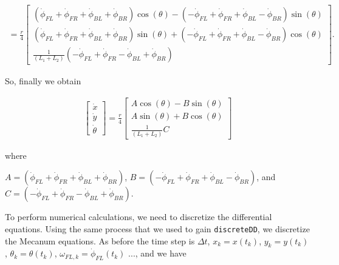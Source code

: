 \[\begin{aligned}
=
\frac{ r}{4}
\begin{bmatrix} \left(\dot{\phi}_{FL} + \dot{\phi}_{FR} + \dot{\phi}_{BL} + \dot{\phi}_{BR}\right) \cos(\theta)
                          -\left( -\dot{\phi}_{FL} + \dot{\phi}_{FR} + \dot{\phi}_{BL} - \dot{\phi}_{BR}\right)\sin(\theta) \\[3mm]
                        \left(\dot{\phi}_{FL} + \dot{\phi}_{FR} + \dot{\phi}_{BL} + \dot{\phi}_{BR}\right) \sin(\theta)
                          +\left( -\dot{\phi}_{FL} + \dot{\phi}_{FR} + \dot{\phi}_{BL} - \dot{\phi}_{BR}\right)\cos(\theta)  \\[3mm]
                            \frac{1}{(L_1+L_2) } \left( -\dot{\phi}_{FL} + \dot{\phi}_{FR} - \dot{\phi}_{BL} +\dot{\phi}_{BR} \right)
         \end{bmatrix} .
\end{aligned}\]

So, finally we obtain

\[\begin{aligned}
\begin{bmatrix}\dot{x}\\[3mm] \dot{y}\\[3mm] \dot{\theta} \end{bmatrix}
=
\frac{ r}{4}
\begin{bmatrix}A\cos(\theta)
 -B\sin(\theta) \\[3mm]
  A \sin(\theta)
 +B\cos(\theta)  \\[3mm]
\frac{1}{(L_1+L_2) } C
\end{bmatrix}
\end{aligned}\]

where

\(A = \left(\dot{\phi}_{FL} + \dot{\phi}_{FR} + \dot{\phi}_{BL} + \dot{\phi}_{BR}\right)\),
\(B = \left( -\dot{\phi}_{FL} + \dot{\phi}_{FR} + \dot{\phi}_{BL} - \dot{\phi}_{BR}\right)\),
and
\(C = \left( -\dot{\phi}_{FL} + \dot{\phi}_{FR} - \dot{\phi}_{BL} +\dot{\phi}_{BR} \right)\).

To perform numerical calculations, we need to discretize the
differential equations. Using the same process that we used to gain
\texttt{discreteDD}, we discretize the Mecanum equations. As before the
time step is \(\Delta t\), \(x_k = x(t_k)\), \(y_k = y(t_k)\),
\(\theta_k = \theta(t_k)\), \(\omega_{FL,k}=\dot{\phi}_{FL}(t_k)\) ...,
and we have

